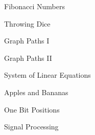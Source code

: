\begin{practice}
\begin{pplist}
  \item Fibonacci Numbers
  \item Throwing Dice
  \item Graph Paths I
  \item Graph Paths II
  \item System of Linear Equations
  \item Apples and Bananas
  \item One Bit Positions
  \item Signal Processing
\end{pplist}
\end{practice}
